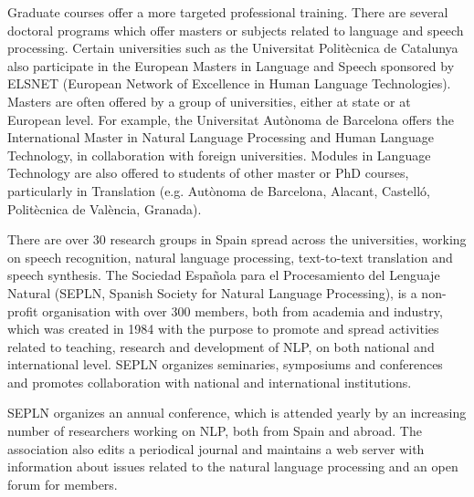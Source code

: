 \begin{multicols}{2}
\begin{itemize}
\begin{multicols}{2}
Graduate courses offer a more targeted professional training. There are several doctoral programs which offer masters or subjects related to language and speech processing. Certain universities such as the Universitat Politècnica de Catalunya also participate in the European Masters in Language and Speech sponsored by ELSNET (European Network of Excellence in Human Language Technologies). Masters are often offered by a group of universities, either at state or at European level. For example, the Universitat Autònoma de Barcelona offers the International Master in Natural Language Processing and Human Language Technology, in collaboration with foreign universities. Modules in Language Technology are also offered to students of other master or PhD courses, particularly in Translation (e.g. Autònoma de Barcelona, Alacant, Castelló, Politècnica de València, Granada).

There are over 30 research groups in Spain spread across the universities, working on speech recognition, natural language processing, text-to-text translation and speech synthesis. The Sociedad Española para el Procesamiento del Lenguaje Natural (SEPLN, Spanish Society for Natural Language Processing), is a non-profit organisation with over 300 members, both from academia and industry, which was created in 1984 with the purpose to promote and spread activities related to teaching, research and development of NLP, on both national and international level. SEPLN organizes seminaries, symposiums and conferences and promotes collaboration with national and international institutions.

SEPLN organizes an annual conference, which is attended yearly by an increasing number of researchers working on NLP, both from Spain and abroad. The association also edits a periodical journal and maintains a web server with information about issues related to the natural language processing and an open forum for members.


\end{multicols}
\end{itemize}
\end{multicols}
